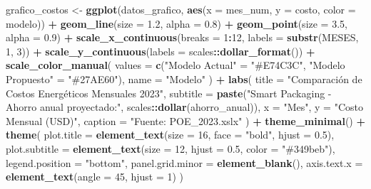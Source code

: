 \documentclass[
]{article}
\newenvironment{Shaded}{\begin{snugshade}}{\end{snugshade}}
\newcommand{\AttributeTok}[1]{\textcolor[rgb]{0.13,0.29,0.53}{#1}}
\newcommand{\DecValTok}[1]{\textcolor[rgb]{0.00,0.00,0.81}{#1}}
\newcommand{\FloatTok}[1]{\textcolor[rgb]{0.00,0.00,0.81}{#1}}
\newcommand{\FunctionTok}[1]{\textcolor[rgb]{0.13,0.29,0.53}{\textbf{#1}}}
\newcommand{\NormalTok}[1]{#1}
\newcommand{\OtherTok}[1]{\textcolor[rgb]{0.56,0.35,0.01}{#1}}
\newcommand{\SpecialCharTok}[1]{\textcolor[rgb]{0.81,0.36,0.00}{\textbf{#1}}}
\newcommand{\StringTok}[1]{\textcolor[rgb]{0.31,0.60,0.02}{#1}}
\begin{document}
\begin{Shaded}
\begin{Highlighting}[]
\NormalTok{grafico\_costos }\OtherTok{\textless{}{-}} \FunctionTok{ggplot}\NormalTok{(datos\_grafico, }\FunctionTok{aes}\NormalTok{(}\AttributeTok{x =}\NormalTok{ mes\_num, }\AttributeTok{y =}\NormalTok{ costo, }\AttributeTok{color =}\NormalTok{ modelo)) }\SpecialCharTok{+}
  \FunctionTok{geom\_line}\NormalTok{(}\AttributeTok{size =} \FloatTok{1.2}\NormalTok{, }\AttributeTok{alpha =} \FloatTok{0.8}\NormalTok{) }\SpecialCharTok{+}
  \FunctionTok{geom\_point}\NormalTok{(}\AttributeTok{size =} \FloatTok{3.5}\NormalTok{, }\AttributeTok{alpha =} \FloatTok{0.9}\NormalTok{) }\SpecialCharTok{+}
  \FunctionTok{scale\_x\_continuous}\NormalTok{(}\AttributeTok{breaks =} \DecValTok{1}\SpecialCharTok{:}\DecValTok{12}\NormalTok{, }\AttributeTok{labels =} \FunctionTok{substr}\NormalTok{(MESES, }\DecValTok{1}\NormalTok{, }\DecValTok{3}\NormalTok{)) }\SpecialCharTok{+}
  \FunctionTok{scale\_y\_continuous}\NormalTok{(}\AttributeTok{labels =}\NormalTok{ scales}\SpecialCharTok{::}\FunctionTok{dollar\_format}\NormalTok{()) }\SpecialCharTok{+}
  \FunctionTok{scale\_color\_manual}\NormalTok{(}
    \AttributeTok{values =} \FunctionTok{c}\NormalTok{(}\StringTok{"Modelo Actual"} \OtherTok{=} \StringTok{"\#E74C3C"}\NormalTok{, }\StringTok{"Modelo Propuesto"} \OtherTok{=} \StringTok{"\#27AE60"}\NormalTok{),}
    \AttributeTok{name =} \StringTok{"Modelo"}
\NormalTok{  ) }\SpecialCharTok{+}
  \FunctionTok{labs}\NormalTok{(}
    \AttributeTok{title =} \StringTok{"Comparación de Costos Energéticos Mensuales 2023"}\NormalTok{,}
    \AttributeTok{subtitle =} \FunctionTok{paste}\NormalTok{(}\StringTok{"Smart Packaging {-} Ahorro anual proyectado:"}\NormalTok{, scales}\SpecialCharTok{::}\FunctionTok{dollar}\NormalTok{(ahorro\_anual)),}
    \AttributeTok{x =} \StringTok{"Mes"}\NormalTok{,}
    \AttributeTok{y =} \StringTok{"Costo Mensual (USD)"}\NormalTok{,}
    \AttributeTok{caption =} \StringTok{"Fuente: POE\_2023.xslx"}
\NormalTok{  ) }\SpecialCharTok{+}
  \FunctionTok{theme\_minimal}\NormalTok{() }\SpecialCharTok{+}
  \FunctionTok{theme}\NormalTok{(}
    \AttributeTok{plot.title =} \FunctionTok{element\_text}\NormalTok{(}\AttributeTok{size =} \DecValTok{16}\NormalTok{, }\AttributeTok{face =} \StringTok{"bold"}\NormalTok{, }\AttributeTok{hjust =} \FloatTok{0.5}\NormalTok{),}
    \AttributeTok{plot.subtitle =} \FunctionTok{element\_text}\NormalTok{(}\AttributeTok{size =} \DecValTok{12}\NormalTok{, }\AttributeTok{hjust =} \FloatTok{0.5}\NormalTok{, }\AttributeTok{color =} \StringTok{"\#349beb"}\NormalTok{),}
    \AttributeTok{legend.position =} \StringTok{"bottom"}\NormalTok{,}
    \AttributeTok{panel.grid.minor =} \FunctionTok{element\_blank}\NormalTok{(),}
    \AttributeTok{axis.text.x =} \FunctionTok{element\_text}\NormalTok{(}\AttributeTok{angle =} \DecValTok{45}\NormalTok{, }\AttributeTok{hjust =} \DecValTok{1}\NormalTok{)}
\NormalTok{  )}
\end{Highlighting}
\end{Shaded}
\end{document}
